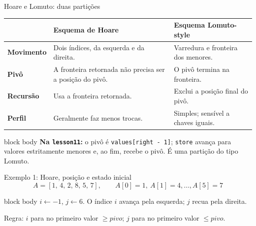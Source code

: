 \documentclass[aspectratio=169,11pt]{beamer}
\newcommand{\citep}[1]{{\color{MidGray}\tiny\cite{#1}}}
\begin{document}
\begin{frame}{Hoare e Lomuto: duas partições}
  \footnotesize
  \begin{tabularx}{\textwidth}{>{\bfseries}p{2.5cm} X X}
    \toprule
    & Esquema de Hoare & Esquema Lomuto-style \\
    \midrule
    Movimento & Dois índices, da esquerda e da direita. & Varredura e fronteira dos menores. \\
    Pivô & A fronteira retornada não precisa ser a posição do pivô. & O pivô termina na fronteira. \\
    Recursão & Usa a fronteira retornada. & Exclui a posição final do pivô. \\
    Perfil & Geralmente faz menos trocas. & Simples; sensível a chaves iguais. \\
    \bottomrule
  \end{tabularx}
  \vspace{.35em}
  \begin{beamercolorbox}[wd=\linewidth,sep=.45em]{block body}
    \scriptsize\textbf{Na \texttt{lesson11}:} o pivô é \texttt{values[right - 1]}; \texttt{store} avança para valores estritamente menores e, ao fim, recebe o pivô. É uma partição do tipo Lomuto.
  \end{beamercolorbox}
  \vfill
  \citep{cormen2022,sedgwick2011}
\end{frame}

\begin{frame}{Exemplo 1: Hoare, posição e estado inicial}
  \small
  \[
    A=[1,\,4,\,2,\,8,\,5,\,7],\qquad
    A[0]=1,\ A[1]=4,\ldots,A[5]=7
  \]
  \begin{center}
  \end{center}
  \begin{beamercolorbox}[wd=\linewidth,sep=.55em]{block body}
    \centering
    \(i\gets -1\), \(j\gets 6\). O índice \(i\) avança pela esquerda; \(j\) recua pela direita.
  \end{beamercolorbox}
  \vspace{.25em}
  \scriptsize Regra: \(i\) para no primeiro valor \(\geq pivo\); \(j\) para no primeiro valor \(\leq pivo\).
  \citep{hoare1962,cormen2022}
\end{frame}
\end{document}
